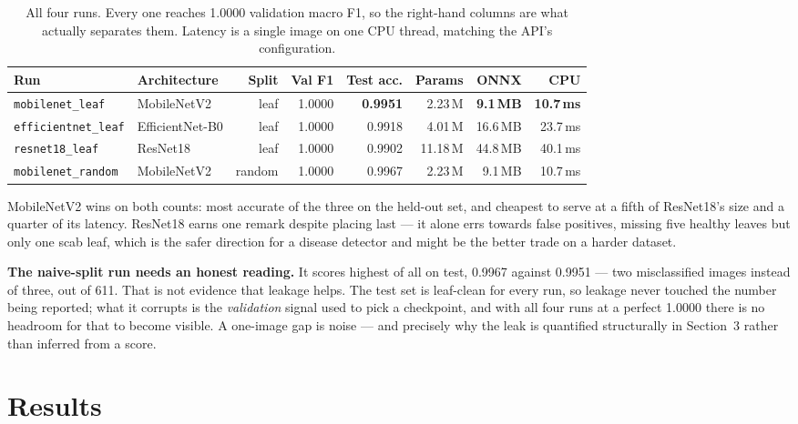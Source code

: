 \documentclass[10pt,a4paper]{article}
\begin{document}
\begin{table}[H]
\centering\small
\caption{All four runs. Every one reaches 1.0000 validation macro F1, so the
right-hand columns are what actually separates them. Latency is a single image on one
CPU thread, matching the API's configuration.}
\begin{tabular}{llrrrrrr}
\toprule
\textbf{Run} & \textbf{Architecture} & \textbf{Split} & \textbf{Val F1} &
\textbf{Test acc.} & \textbf{Params} & \textbf{ONNX} & \textbf{CPU} \\
\midrule
\texttt{mobilenet\_leaf}     & MobileNetV2     & leaf   & 1.0000 & \textbf{0.9951} & 2.23\,M  & \textbf{9.1\,MB}  & \textbf{10.7\,ms} \\
\texttt{efficientnet\_leaf}  & EfficientNet-B0 & leaf   & 1.0000 & 0.9918 & 4.01\,M  & 16.6\,MB & 23.7\,ms \\
\texttt{resnet18\_leaf}      & ResNet18        & leaf   & 1.0000 & 0.9902 & 11.18\,M & 44.8\,MB & 40.1\,ms \\
\texttt{mobilenet\_random}   & MobileNetV2     & random & 1.0000 & 0.9967 & 2.23\,M  & 9.1\,MB  & 10.7\,ms \\
\bottomrule
\end{tabular}
\end{table}

MobileNetV2 wins on both counts: most accurate of the three on the held-out set, and
cheapest to serve at a fifth of ResNet18's size and a quarter of its latency. ResNet18
earns one remark despite placing last --- it alone errs towards false positives, missing
five healthy leaves but only one scab leaf, which is the safer direction for a disease
detector and might be the better trade on a harder dataset.

\textbf{The naive-split run needs an honest reading.} It scores highest of all on test,
0.9967 against 0.9951 --- two misclassified images instead of three, out of 611. That is
not evidence that leakage helps. The test set is leaf-clean for every run, so leakage
never touched the number being reported; what it corrupts is the \emph{validation} signal
used to pick a checkpoint, and with all four runs at a perfect 1.0000 there is no headroom
for that to become visible. A one-image gap is noise --- and precisely why the leak is
quantified structurally in Section~3 rather than inferred from a score.

\section{Results}
\end{document}
